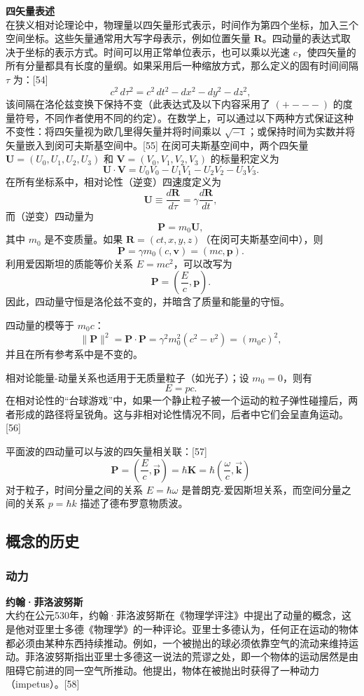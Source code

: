 \textbf{四矢量表述}\\
在狭义相对论理论中，物理量以四矢量形式表示，时间作为第四个坐标，加入三个空间坐标。这些矢量通常用大写字母表示，例如位置矢量 \( \mathbf{R} \)。四动量的表达式取决于坐标的表示方式。时间可以用正常单位表示，也可以乘以光速 \( c \)，使四矢量的所有分量都具有长度的量纲。如果采用后一种缩放方式，那么定义的固有时间间隔 \( \tau \) 为：[54]
\[
c^2 \, d\tau^2 = c^2 \, dt^2 - dx^2 - dy^2 - dz^2,~
\]
该间隔在洛伦兹变换下保持不变（此表达式及以下内容采用了 \( (+ - - -) \) 的度量符号，不同作者使用不同的约定）。在数学上，可以通过以下两种方式保证这种不变性：将四矢量视为欧几里得矢量并将时间乘以 \( \sqrt{-1} \)；或保持时间为实数并将矢量嵌入到闵可夫斯基空间中。[55] 在闵可夫斯基空间中，两个四矢量 \( \mathbf{U} = (U_0, U_1, U_2, U_3) \) 和 \( \mathbf{V} = (V_0, V_1, V_2, V_3) \) 的标量积定义为
\[
\mathbf{U} \cdot \mathbf{V} = U_0 V_0 - U_1 V_1 - U_2 V_2 - U_3 V_3.~
\]
在所有坐标系中，相对论性（逆变）四速度定义为
\[
\mathbf{U} \equiv \frac{d\mathbf{R}}{d\tau} = \gamma \frac{d\mathbf{R}}{dt},~
\]
而（逆变）四动量为
\[
\mathbf{P} = m_0 \mathbf{U},~
\]
其中 \( m_0 \) 是不变质量。如果 \( \mathbf{R} = (ct, x, y, z) \)（在闵可夫斯基空间中），则
\[
\mathbf{P} = \gamma m_0 \left(c, \mathbf{v}\right) = (mc, \mathbf{p}).~
\]
利用爱因斯坦的质能等价关系 \( E = mc^2 \)，可以改写为
\[
\mathbf{P} = \left(\frac{E}{c}, \mathbf{p}\right).~
\]
因此，四动量守恒是洛伦兹不变的，并暗含了质量和能量的守恒。

四动量的模等于 \( m_0 c \)：
\[
\|\mathbf{P}\|^2 = \mathbf{P} \cdot \mathbf{P} = \gamma^2 m_0^2 \left(c^2 - v^2\right) = (m_0 c)^2,~
\]
并且在所有参考系中是不变的。

相对论能量-动量关系也适用于无质量粒子（如光子）；设 \( m_0 = 0 \)，则有
\[
E = pc.~
\]
在相对论性的“台球游戏”中，如果一个静止粒子被一个运动的粒子弹性碰撞后，两者形成的路径将呈锐角。这与非相对论性情况不同，后者中它们会呈直角运动。[56]

平面波的四动量可以与波的四矢量相关联：[57]
\[
\mathbf{P} = \left(\frac{E}{c}, \vec{\mathbf{p}}\right) = \hbar \mathbf{K} = \hbar \left(\frac{\omega}{c}, \vec{\mathbf{k}}\right)~
\]
对于粒子，时间分量之间的关系 \( E = \hbar \omega \) 是普朗克-爱因斯坦关系，而空间分量之间的关系 \( p = \hbar k \) 描述了德布罗意物质波。
\subsection{概念的历史}  
\subsubsection{动力}
\textbf{约翰·菲洛波努斯}\\
大约在公元530年，约翰·菲洛波努斯在《物理学评注》中提出了动量的概念，这是他对亚里士多德《物理学》的一种评论。亚里士多德认为，任何正在运动的物体都必须由某种东西持续推动。例如，一个被抛出的球必须依靠空气的流动来维持运动。菲洛波努斯指出亚里士多德这一说法的荒谬之处，即一个物体的运动居然是由阻碍它前进的同一空气所推动。他提出，物体在被抛出时获得了一种动力（impetus）。[58]

